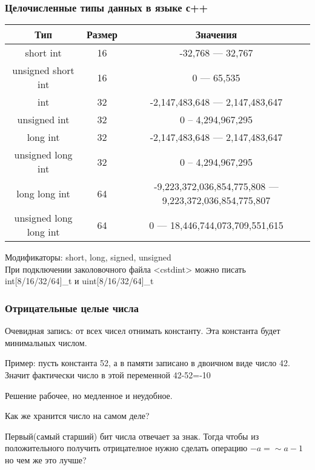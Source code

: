 \begin{frame}
    \frametitle{Целочисленные типы данных в языке с++}

    \begin{center}
        \small
        \begin{tabular}{|c|c|c|}
            \hline
            Тип & Размер & Значения \\
            \hline
            short int & 16 & -32,768 --- 32,767\\
            \hline
            unsigned short int & 16 & 0 --- 65,535\\
            \hline
            int & 32 & -2,147,483,648 --- 2,147,483,647\\
            \hline
            unsigned int & 32 & 0 -- 4,294,967,295\\
            \hline
            long int & 32 & -2,147,483,648 --- 2,147,483,647\\
            \hline
            unsigned long int & 32 & 0 -- 4,294,967,295\\
            \hline
            long long int & 64 & -9,223,372,036,854,775,808 --- 9,223,372,036,854,775,807\\
            \hline
            unsigned long long int & 64 & 0 --- 18,446,744,073,709,551,615\\
            \hline
        \end{tabular}
    \end{center}

    \quad Модификаторы: short, long, signed, unsigned\\
    \quad При подключении заколовочного файла <cstdint> можно писать int[8/16/32/64]\_t и uint[8/16/32/64]\_t
\end{frame}


\begin{frame}
    \frametitle{Отрицательные целые числа}
    \quad Очевидная запись: от всех чисел отнимать константу. Эта константа будет минимальных числом.

    \quad Пример: пусть константа 52, а в памяти записано в двоичном виде число 42. Значит фактически число в этой переменной 42-52=-10   

    \quad Решение рабочее, но медленное и неудобное.

    \quad Как же хранится число на самом деле? 

    \quad Первый(самый старший) бит числа отвечает за знак. Тогда чтобы из положительного получить отрицателное нужно сделать операцию $-a = \sim a - 1$ но чем же это лучше?
\end{frame}

